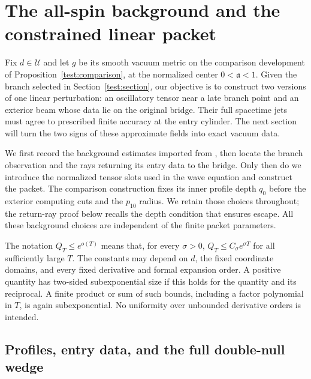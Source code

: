 \section{The all-spin background and the constrained linear packet}
\label{sec:background}
\label{bg:section}

Fix $d\in\mathcal U$ and let $g$ be its smooth vacuum metric on the
comparison development of Proposition~\ref{test:comparison}, at the
normalized center $0<\mathfrak a<1$. Given the branch selected in
Section~\ref{test:section}, our objective is to construct two versions
of one linear perturbation: an oscillatory tensor near a late branch
point and an exterior beam whose data lie on the original bridge.
Their full spacetime jets must agree to prescribed finite accuracy at
the entry cylinder. The next
section will turn the two signs of these approximate fields into exact
vacuum data.

We first record the background estimates imported from
\cite{Foundation}, then locate the branch observation and the rays
returning its entry data to the bridge. Only then do we introduce the
normalized tensor slots used in the wave equation and construct the
packet. The comparison construction fixes its inner profile depth
$q_0$ before the exterior computing cuts and the $p_{10}$ radius.
We retain those choices throughout; the return-ray proof below recalls
the depth condition that ensures escape. All these background choices
are independent of the finite packet parameters.

\begin{definition}\label{bg:subexponential}
The notation $Q_T\le e^{o(T)}$ means that, for every $\sigma>0$,
$Q_T\le C_\sigma e^{\sigma T}$ for all sufficiently large $T$.
The constants may depend on $d$, the fixed coordinate domains, and
every fixed derivative and formal expansion order.  A positive
quantity has two-sided subexponential size if this holds for the
quantity and its reciprocal.  A finite product or sum of such bounds,
including a factor polynomial in $T$, is again subexponential.
No uniformity over unbounded derivative orders is intended.
\end{definition}

\subsection{Profiles, entry data, and the full double-null wedge}

